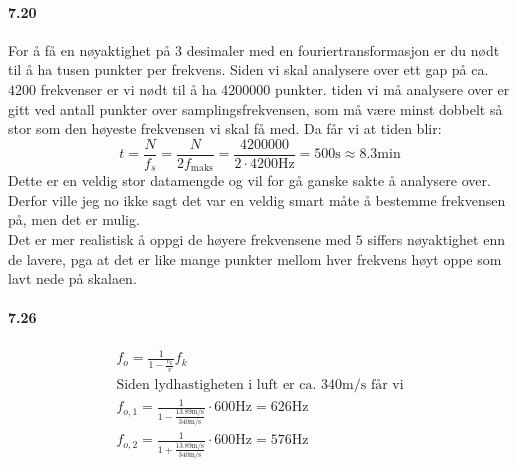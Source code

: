 \documentclass[11pt, A4paper,norsk]{article}
\begin{document}
		\paragraph{7.20}
			\begin{flushleft}
For å få en nøyaktighet på $3$ desimaler med en fouriertransformasjon er du nødt til å ha tusen punkter per frekvens. Siden vi skal analysere over ett gap på ca. $4200$ frekvenser er vi nødt til å ha $4 200 000$ punkter. tiden vi må analysere over er gitt ved antall punkter over samplingsfrekvensen, som må være minst dobbelt så stor som den høyeste frekvensen vi skal få med. Da får vi at tiden blir:
$$t = \frac{N}{f_s} = \frac{N}{2f_{\text{maks}}} = \frac{4 200 000}{2 \cdot 4 200\text{Hz}} = 500\text{s} \approx 8.3\text{min}$$
Dette er en veldig stor datamengde og vil for gå ganske sakte å analysere over. Derfor ville jeg no ikke sagt det var en veldig smart måte å bestemme frekvensen på, men det er mulig. \\
Det er mer realistisk å oppgi de høyere frekvensene med $5$ siffers nøyaktighet enn de lavere, pga at det er like mange punkter mellom hver frekvens høyt oppe som lavt nede på skalaen.
			\end{flushleft}







		\paragraph{7.26}
			\begin{gather*}
f_o = \frac{1}{1 - \frac{v_k}{v}}f_k \\
\text{Siden lydhastigheten i luft er ca. $340\text{m/s}$ får vi} \\
f_{o,1} = \frac{1}{1 - \frac{13.89\text{m/s}}{340\text{m/s}}} \cdot 600\text{Hz} = 626\text{Hz} \\
f_{o,2} = \frac{1}{1 + \frac{13.89\text{m/s}}{340\text{m/s}}} \cdot 600\text{Hz} = 576\text{Hz}
			\end{gather*}
\end{document}
